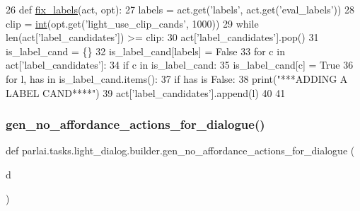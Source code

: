 \begin{DoxyCode}
26 \textcolor{keyword}{def }\hyperlink{namespaceparlai_1_1tasks_1_1light__dialog_1_1builder_aafb760ba2e05ffe5cad429327d0dd347}{fix\_labels}(act, opt):
27     labels = act.get(\textcolor{stringliteral}{'labels'}, act.get(\textcolor{stringliteral}{'eval\_labels'}))
28     clip = \hyperlink{namespacelanguage__model_1_1eval__ppl_a7d12ee00479673c5c8d1f6d01faa272a}{int}(opt.get(\textcolor{stringliteral}{'light\_use\_clip\_cands'}, 1000))
29     \textcolor{keywordflow}{while} len(act[\textcolor{stringliteral}{'label\_candidates'}]) >= clip:
30         act[\textcolor{stringliteral}{'label\_candidates'}].pop()
31     is\_label\_cand = \{\}
32     is\_label\_cand[labels] = \textcolor{keyword}{False}
33     \textcolor{keywordflow}{for} c \textcolor{keywordflow}{in} act[\textcolor{stringliteral}{'label\_candidates'}]:
34         \textcolor{keywordflow}{if} c \textcolor{keywordflow}{in} is\_label\_cand:
35             is\_label\_cand[c] = \textcolor{keyword}{True}
36     \textcolor{keywordflow}{for} l, has \textcolor{keywordflow}{in} is\_label\_cand.items():
37         \textcolor{keywordflow}{if} has \textcolor{keywordflow}{is} \textcolor{keyword}{False}:
38             print(\textcolor{stringliteral}{"***ADDING A LABEL CAND****"})
39             act[\textcolor{stringliteral}{'label\_candidates'}].append(l)
40 
41 
\end{DoxyCode}
\mbox{\label{namespaceparlai_1_1tasks_1_1light__dialog_1_1builder_a537e075c89058b67eb0db786f98491de}} 
\subsubsection{\texorpdfstring{gen\+\_\+no\+\_\+affordance\+\_\+actions\+\_\+for\+\_\+dialogue()}{gen\_no\_affordance\_actions\_for\_dialogue()}}
{\footnotesize\ttfamily def parlai.\+tasks.\+light\+\_\+dialog.\+builder.\+gen\+\_\+no\+\_\+affordance\+\_\+actions\+\_\+for\+\_\+dialogue (\begin{DoxyParamCaption}\item[{}]{d }\end{DoxyParamCaption})}



